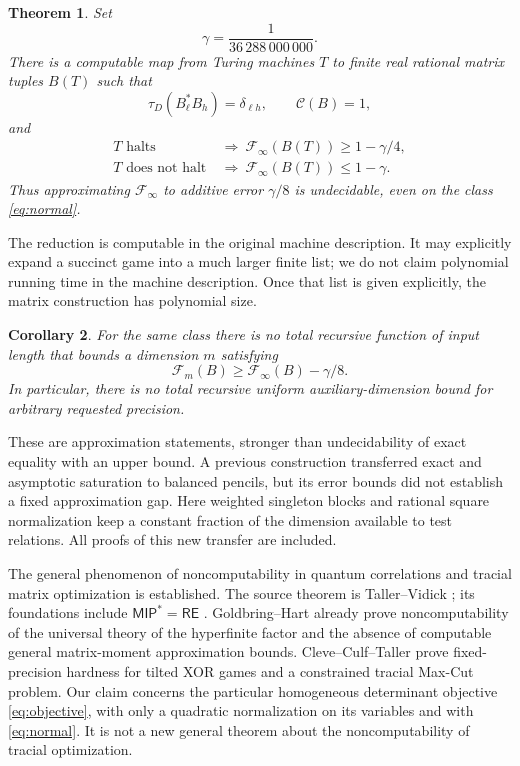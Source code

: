 \documentclass[11pt,a4paper]{article}
\newtheorem{theorem}{Theorem}
\newtheorem{corollary}[theorem]{Corollary}
\newcommand{\F}{\mathcal F}
\newcommand{\K}{\mathcal C}
\begin{document}
\begin{theorem}\label{thm:main}
Set
\[
 \gamma=\frac1{36\,288\,000\,000}.
\]
There is a computable map from Turing machines $T$ to finite real rational matrix tuples $B(T)$ such that
\begin{equation}
 \tau_D(B_\ell^*B_h)=\delta_{\ell h},
 \qquad \K(B)=1,                                      \label{eq:normal}
\end{equation}
and
\begin{align}
 T\text{ halts}&\ \Longrightarrow\
       \F_\infty(B(T))\ge1-\gamma/4, \label{eq:yes}\\
 T\text{ does not halt}&\ \Longrightarrow\
       \F_\infty(B(T))\le1-\gamma.   \label{eq:no}
\end{align}
Thus approximating $\F_\infty$ to additive error $\gamma/8$ is undecidable, even on the class \eqref{eq:normal}.
\end{theorem}

The reduction is computable in the original machine description. It may explicitly expand a succinct game into a much larger finite list; we do not claim polynomial running time in the machine description. Once that list is given explicitly, the matrix construction has polynomial size.

\begin{corollary}\label{cor:dimension}
For the same class there is no total recursive function of input length that bounds a dimension $m$ satisfying
\[
 \F_m(B)\ge\F_\infty(B)-\gamma/8.
\]
In particular, there is no total recursive uniform auxiliary-dimension bound for arbitrary requested precision.
\end{corollary}

These are approximation statements, stronger than undecidability of exact equality with an upper bound. A previous construction \cite{prior} transferred exact and asymptotic saturation to balanced pencils, but its error bounds did not establish a fixed approximation gap. Here weighted singleton blocks and rational square normalization keep a constant fraction of the dimension available to test relations. All proofs of this new transfer are included.

The general phenomenon of noncomputability in quantum correlations and tracial matrix optimization is established. The source theorem is Taller--Vidick \cite{tv}; its foundations include $\mathsf{MIP}^*=\mathsf{RE}$ \cite{mip}. Goldbring--Hart \cite{gh} already prove noncomputability of the universal theory of the hyperfinite factor and the absence of computable general matrix-moment approximation bounds. Cleve--Culf--Taller \cite{cct} prove fixed-precision hardness for tilted XOR games and a constrained tracial Max-Cut problem. Our claim concerns the particular homogeneous determinant objective \eqref{eq:objective}, with only a quadratic normalization on its variables and with \eqref{eq:normal}. It is not a new general theorem about the noncomputability of tracial optimization.
\end{document}
